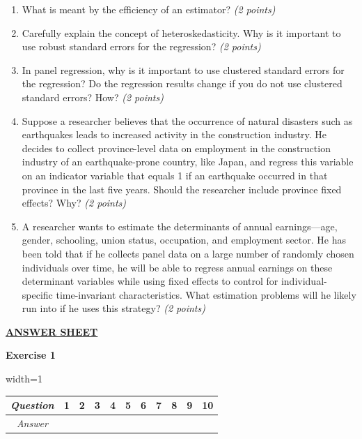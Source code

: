 \documentclass{article}
\begin{document}
\begin{enumerate}[label=\alph*)]

\item What is meant by the efficiency of an estimator? \textit{(2 points)}
\item Carefully explain the concept of heteroskedasticity. Why is it important to use robust standard errors for the regression? \textit{(2 points)}
\item In panel regression, why is it important to use clustered standard errors for the regression? Do the regression results change if you do not use clustered standard errors? How? \textit{(2 points)}
\item Suppose a researcher believes that the occurrence of natural disasters such as earthquakes leads to increased activity in the construction industry. He decides to collect province-level data on employment in the construction industry of an earthquake-prone country, like Japan, and regress this variable on an indicator variable that equals 1 if an earthquake occurred in that province in the last five years. Should the researcher include province fixed effects? Why? \textit{(2 points)} %
\item A researcher wants to estimate the determinants of annual earnings—age, gender, schooling, union status, occupation, and employment sector. He has been told that if he collects panel data on a large number of randomly chosen individuals over time, he will be able to regress annual earnings on these determinant variables while using fixed effects to control for individual-specific time-invariant characteristics. What estimation problems will he likely run into if he uses this strategy? \textit{(2 points)}%

\end{enumerate}


\newpage
{}

\begin{center}
    \textbf{\Large \underline{ANSWER SHEET}}
\end{center}
\vspace{1cm}

\textbf{Exercise 1}\vspace{.25cm}
\begin{table}[hp!]
\centering
\begin{adjustbox}{width=1\textwidth}
\begin{tabular}{|c|c|c|c|c|c|c|c|c|c|c|}
\hline
\rowcolor[HTML]{EFEFEF} 
\textit{Question} & 1 & 2 & 3 & 4 & 5 & 6 & 7 & 8 & 9 & 10 \\ \hline
\textit{Answer}   &   &   &   &   &   &   &   &   &   &    \\ \hline
\end{tabular}
\end{adjustbox}
\end{table}
\vspace{1cm}
\end{document}
